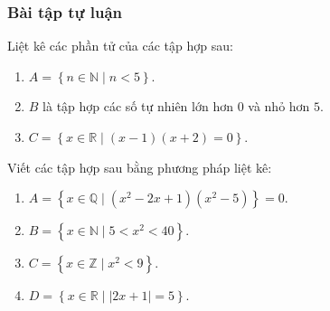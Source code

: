 \subsubsection{Bài tập tự luận}
\begin{bt}%
	Liệt kê các phần tử của các tập hợp sau:
	\begin{enumerate}
		\item $A=\left\lbrace n\in \mathbb{N} \mid n<5\right\rbrace$.
		\item $B$ là tập hợp các số tự nhiên lớn hơn $0$ và nhỏ hơn $5$.
		\item $C=\left\lbrace x\in \mathbb{R}\mid (x-1)(x+2)=0\right\rbrace$.
	\end{enumerate}
\end{bt}
\begin{bt}%
	Viết các tập hợp sau bằng phương pháp liệt kê:
	\begin{enumerate}
		\item $A=\left\lbrace  x\in \mathbb{Q}\mid (x^2-2x+1)(x^2-5)\right\rbrace=0$.
		\item $B=\left\lbrace x \in \mathbb{N}\mid 5<x^2<40\right\rbrace$.
		\item $C=\left\lbrace x\in \mathbb{Z}\mid x^2<9\right\rbrace$.
		\item $D=\left\lbrace x\in \mathbb{R}\mid \left|2x+1\right|=5\right\rbrace$.
	\end{enumerate}
\end{bt}
